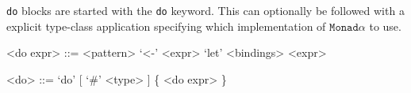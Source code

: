 \texttt{do} blocks are started with the \texttt{do} keyword. This can optionally be followed with a explicit type-class application specifying which implementation of $\mathtt{Monad} \alpha$ to use.

\begin{grammar}
<do expr> ::= <pattern> `<-' <expr>
           \alt `let' <bindings>
           \alt <expr>

<do>      ::= `do' [ `#' <type> ] \{ <do expr> \}
\end{grammar}

